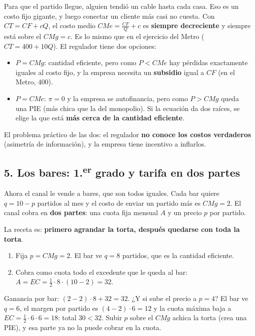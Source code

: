 \documentclass[11pt]{article}
\begin{document}
Para que el partido llegue, alguien tendió un cable hasta cada casa. Eso es un costo fijo gigante, y luego conectar un cliente más casi no cuesta. Con $CT = CF + cQ$, el costo medio $CMe = \tfrac{CF}{Q} + c$ es \textbf{siempre decreciente} y siempre está sobre el $CMg = c$. Es lo mismo que en el ejercicio del Metro ($CT = 400 + 10Q$). El regulador tiene dos opciones:
\begin{itemize}[leftmargin=*,itemsep=2pt]
\item $P = CMg$: cantidad eficiente, pero como $P < CMe$ hay pérdidas exactamente iguales al costo fijo, y la empresa necesita un \textbf{subsidio} igual a $CF$ (en el Metro, 400).
\item $P = CMe$: $\pi = 0$ y la empresa se autofinancia, pero como $P > CMg$ queda una PIE (más chica que la del monopolio). Si la ecuación da dos raíces, se elige la que está \textbf{más cerca de la cantidad eficiente}.
\end{itemize}
El problema práctico de las dos: el regulador \textbf{no conoce los costos verdaderos} (asimetría de información), y la empresa tiene incentivo a inflarlos.

\subsection*{5. Los bares: 1.\textsuperscript{er} grado y tarifa en dos partes}

Ahora el canal le vende a bares, que son todos iguales. Cada bar quiere $q = 10 - p$ partidos al mes y el costo de enviar un partido más es $CMg = 2$. El canal cobra en \textbf{dos partes}: una cuota fija mensual $A$ y un precio $p$ por partido.

La receta es: \textbf{primero agrandar la torta, después quedarse con toda la torta}.
\begin{enumerate}[leftmargin=*,itemsep=2pt]
\item Fija $p = CMg = 2$. El bar ve $q = 8$ partidos, que es la cantidad eficiente.
\item Cobra como cuota todo el excedente que le queda al bar: $A = EC = \tfrac12\cdot 8\cdot(10 - 2) = 32$.
\end{enumerate}
Ganancia por bar: $(2 - 2)\cdot 8 + 32 = 32$. ¿Y si sube el precio a $p = 4$? El bar ve $q = 6$, el margen por partido es $(4 - 2)\cdot 6 = 12$ y la cuota máxima baja a $EC = \tfrac12\cdot 6\cdot 6 = 18$: total $30 < 32$. Subir $p$ sobre el $CMg$ achica la torta (crea una PIE), y esa parte ya no la puede cobrar en la cuota.
\end{document}
